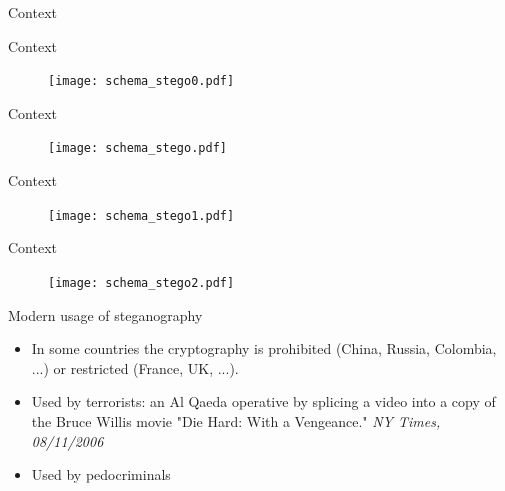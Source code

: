 \documentclass[10pt,aspectratio=169]{beamer}
\begin{document}
\begin{frame}{Context}
\end{frame}


\begin{frame}{Context}
    \begin{figure}[h]
        \texttt{[image: schema\_stego0.pdf]}
    \end{figure}
\end{frame}

\begin{frame}{Context}
    \begin{figure}[h]
        \texttt{[image: schema\_stego.pdf]}
    \end{figure}
\end{frame}

\begin{frame}{Context}
    \begin{figure}[h]
        \texttt{[image: schema\_stego1.pdf]}
    \end{figure}
\end{frame}
    

\begin{frame}{Context}
    \begin{figure}[h]
        \texttt{[image: schema\_stego2.pdf]}
    \end{figure}
\end{frame}

\begin{frame}{Modern usage of steganography}
    \begin{itemize}
        \setlength\itemsep{2em}
        \item In some countries the cryptography is prohibited (China, Russia, Colombia, ...) or restricted (France, UK, ...). 
        \item Used by terrorists: an Al Qaeda operative by splicing a video into a copy of the Bruce Willis movie "Die Hard:
        With a Vengeance." \textit{NY Times, 08/11/2006}
        \item Used by pedocriminals
    \end{itemize}
\end{frame}

\end{document}
